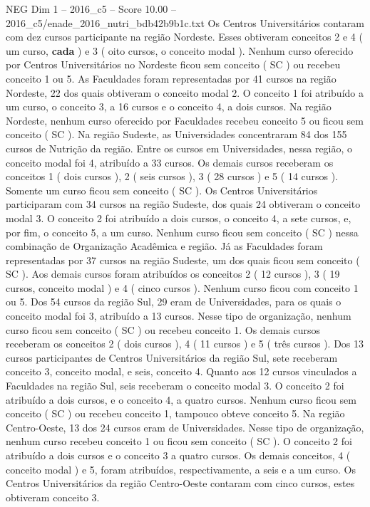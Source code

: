 \begin{textsample}{NEG Dim 1 – 2016\_c5 – Score 10.00 – 2016\_c5/enade\_2016\_nutri\_bdb42b9b1c.txt}
Os Centros Universitários contaram com dez cursos participante na região Nordeste.
Esses obtiveram conceitos 2 e 4 ( um curso, \textbf{cada} ) e 3 ( oito cursos, o conceito modal ).
Nenhum curso oferecido por Centros Universitários no Nordeste ficou sem conceito ( SC ) ou recebeu conceito 1 ou 5.
As Faculdades foram representadas por 41 cursos na região Nordeste, 22 dos quais obtiveram o conceito modal 2.
O conceito 1 foi atribuído a um curso, o conceito 3, a 16 cursos e o conceito 4, a dois cursos.
Na região Nordeste, nenhum curso oferecido por Faculdades recebeu conceito 5 ou ficou sem conceito ( SC ).
Na região Sudeste, as Universidades concentraram 84 dos 155 cursos de Nutrição da região.
Entre os cursos em Universidades, nessa região, o conceito modal foi 4, atribuído a 33 cursos.
Os demais cursos receberam os conceitos 1 ( dois cursos ), 2 ( seis cursos ), 3 ( 28 cursos ) e 5 ( 14 cursos ).
Somente um curso ficou sem conceito ( SC ).
Os Centros Universitários participaram com 34 cursos na região Sudeste, dos quais 24 obtiveram o conceito modal 3.
O conceito 2 foi atribuído a dois cursos, o conceito 4, a sete cursos, e, por fim, o conceito 5, a um curso.
Nenhum curso ficou sem conceito ( SC ) nessa combinação de Organização Acadêmica e região.
Já as Faculdades foram representadas por 37 cursos na região Sudeste, um dos quais ficou sem conceito ( SC ).
Aos demais cursos foram atribuídos os conceitos 2 ( 12 cursos ), 3 ( 19 cursos, conceito modal ) e 4 ( cinco cursos ).
Nenhum curso ficou com conceito 1 ou 5.
Dos 54 cursos da região Sul, 29 eram de Universidades, para os quais o conceito modal foi 3, atribuído a 13 cursos.
Nesse tipo de organização, nenhum curso ficou sem conceito ( SC ) ou recebeu conceito 1.
Os demais cursos receberam os conceitos 2 ( dois cursos ), 4 ( 11 cursos ) e 5 ( três cursos ).
Dos 13 cursos participantes de Centros Universitários da região Sul, sete receberam conceito 3, conceito modal, e seis, conceito 4.
Quanto aos 12 cursos vinculados a Faculdades na região Sul, seis receberam o conceito modal 3.
O conceito 2 foi atribuído a dois cursos, e o conceito 4, a quatro cursos.
Nenhum curso ficou sem conceito ( SC ) ou recebeu conceito 1, tampouco obteve conceito 5.
Na região Centro-Oeste, 13 dos 24 cursos eram de Universidades.
Nesse tipo de organização, nenhum curso recebeu conceito 1 ou ficou sem conceito ( SC ).
O conceito 2 foi atribuído a dois cursos e o conceito 3 a quatro cursos.
Os demais conceitos, 4 ( conceito modal ) e 5, foram atribuídos, respectivamente, a seis e a um curso.
Os Centros Universitários da região Centro-Oeste contaram com cinco cursos, estes obtiveram conceito 3.

\end{textsample}
